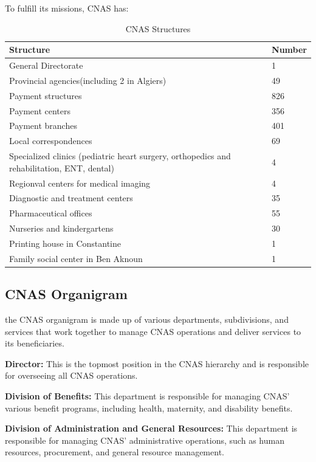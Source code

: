 \medskip To fulfill its missions, CNAS has: 
\begin{table}[htbp]
  \centering
  \begin{tabular}{|p{10cm}|l|}
  \hline
  \textbf{Structure} & \textbf{Number} \\
  \hline
  General Directorate & 1 \\
  \hline
  Provincial agencies(including 2 in Algiers)  & 49 \\
  \hline
  Payment structures & 826 \\
  \hline
  Payment centers & 356 \\
  \hline
  Payment branches & 401 \\
  \hline
  Local correspondences & 69 \\
  \hline
  Specialized clinics (pediatric heart surgery, orthopedics and rehabilitation, ENT, dental) & 4 \\
  \hline
  Regionval centers for medical imaging & 4 \\
  \hline
  Diagnostic and treatment centers & 35 \\
  \hline
  Pharmaceutical offices & 55 \\
  \hline
  Nurseries and kindergartens & 30 \\
  \hline
  Printing house in Constantine & 1 \\
  \hline
  Family social center in Ben Aknoun & 1 \\
  \hline
  \end{tabular}
  \caption{CNAS Structures}
  \end{table}

\newpage
\subsection{CNAS Organigram}
the CNAS organigram is made up of various departments, subdivisions, and services that work together to manage CNAS operations and deliver services to its beneficiaries.

\medskip \textbf{Director:} This is the topmost position in the CNAS hierarchy and is responsible for overseeing all CNAS operations.

\textbf{Division of Benefits:} This department is responsible for managing CNAS' various benefit programs, including health, maternity, and disability benefits.

\textbf{Division of Administration and General Resources:} This department is responsible for managing CNAS' administrative operations, such as human resources, procurement, and general resource management.

